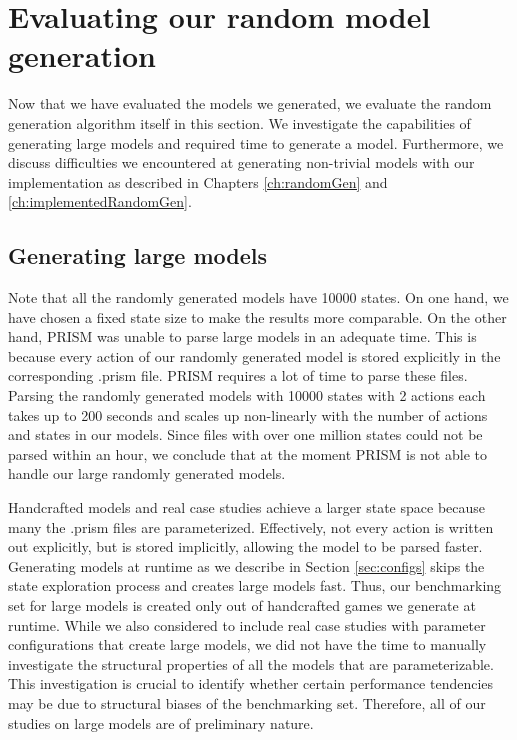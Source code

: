\section{Evaluating our random model generation}
Now that we have evaluated the models we generated, we evaluate the random generation algorithm itself in this section.
We investigate the capabilities of generating large models and required time to generate a model. Furthermore, we discuss difficulties 
we encountered at generating non-trivial models with our implementation as described in Chapters \ref{ch:randomGen} and \ref{ch:implementedRandomGen}.

\subsection{Generating large models} \label{subsec:largeModels}
Note that all the randomly generated models have 10000 states. On one hand, we have chosen a fixed state size to make the results more comparable.
On the other hand, PRISM was unable to parse large models in an adequate time.
This is because every action of our randomly generated model is stored explicitly in the corresponding .prism file.
PRISM requires a lot of time to parse these files. Parsing the randomly generated models with 10000 states with 2 actions each takes
up to 200 seconds and scales up non-linearly with the number of actions and states in our models.
Since files with over one million states could not be parsed within an hour, we conclude that at the moment PRISM is not able to handle our large randomly generated models.

Handcrafted models and real case studies achieve a larger state space because many the .prism files are parameterized.
Effectively, not every action is written out explicitly, but is stored implicitly, allowing the model to be parsed faster.
Generating models at runtime as we describe in Section \ref{sec:configs} skips the state exploration process and 
creates large models fast. 
Thus, our benchmarking set for large models is created only out of handcrafted games we generate at runtime. 
While we also considered to include real case studies with parameter configurations that create large models, 
we did not have the time to manually investigate the structural properties of all the models that are parameterizable.
This investigation is crucial to identify whether certain performance tendencies may be due to structural biases of the benchmarking set.
Therefore, all of our studies on large models are of preliminary nature.

